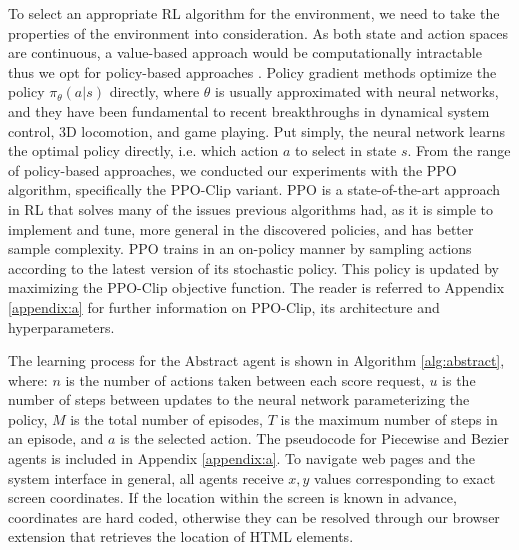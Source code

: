 To select an appropriate \gls{RL} algorithm for the environment, we need to take the properties of the environment into consideration.
As both state and action spaces are continuous, a value-based approach would be computationally intractable thus we opt for policy-based approaches \cite{sutton1999policy}.
Policy gradient methods optimize the policy $\pi_\theta(a|s)$ directly, where $\theta$ is usually approximated with neural networks, and they have been fundamental to recent breakthroughs in dynamical system control, 3D locomotion, and game playing.
Put simply, the neural network learns the optimal policy directly, i.e. which action $a$ to select in state $s$.
From the range of policy-based approaches, we conducted our experiments with the \gls{PPO} algorithm, specifically the PPO-Clip variant.
\gls{PPO} \cite{schulman2017proximal} is a state-of-the-art approach in \gls{RL} that solves many of the issues previous algorithms had, as it is simple to implement and tune, more general in the discovered policies, and has better sample complexity.
\gls{PPO} trains in an on-policy manner by sampling actions according to the latest version of its stochastic policy.
This policy is updated by maximizing the PPO-Clip objective function.
The reader is referred to Appendix \ref{appendix:a} for further information on PPO-Clip, its architecture and hyperparameters.

The learning process for the Abstract agent is shown in Algorithm \ref{alg:abstract}, where: $n$ is the number of actions taken between each score request, $u$ is the number of steps between updates to the neural network parameterizing the policy, $M$ is the total number of episodes, $T$ is the maximum number of steps in an episode, and $a$ is the selected action.
The pseudocode for Piecewise and Bezier agents is included in Appendix \ref{appendix:a}.
To navigate web pages and the system interface in general, all agents receive $x,y$ values corresponding to exact screen coordinates.
If the location within the screen is known in advance, coordinates are hard coded, otherwise they can be resolved through our browser extension that retrieves the location of HTML elements.


